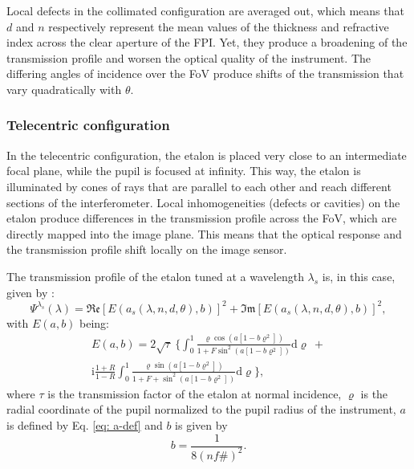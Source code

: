 Local defects in the collimated configuration are averaged out, which means that $d$ and $n$ respectively represent the mean values of the thickness and refractive index across the clear aperture of the FPI. Yet, they produce a broadening of the transmission profile and worsen the optical quality of the instrument. The differing angles of incidence over the FoV produce shifts of the transmission that vary quadratically with $\theta$.

\subsubsection{\label{susec: Tele-perfe}Telecentric configuration}

In the telecentric configuration, the etalon is placed very close to an intermediate focal plane, while the pupil is focused at infinity. This way, the etalon is illuminated by cones of rays that are parallel to each other and reach different sections of the interferometer. Local inhomogeneities (defects or cavities) on the etalon produce differences in the transmission profile across the FoV, which are directly mapped into the image plane. This means that the optical response and the transmission profile shift locally on the image sensor. 

The transmission profile of the etalon tuned at a wavelength $\lambda _s $ is, in this case, given by \citep{franIV}:
\begin{equation}
\Psi ^{\lambda _ s} (\lambda) =  \mathfrak{Re}\left[E(a_s (\lambda, n, d, \theta), b) \right] ^2 + \mathfrak{Im}\left[E(a_s(\lambda, n, d, \theta), b) \right] ^2 ,
\label{Eqn: Tel_first}
\end{equation}
with $E(a,b)$ being:
\begin{multline}
E(a, b) = 2 \sqrt{\tau}\ \Biggl\{ \int_0^1 \frac{\varrho \cos \left(a\left[1-b \varrho^2\right]\right)}{1+F \sin ^2\left(a\left[1-b \varrho^2\right]\right)} \mathrm{d} \varrho \ + \\
\mathrm{i} \frac{1+R}{1-R} \int_0^1 \frac{\varrho \sin \left(a\left[1-b \varrho^2\right]\right)}{1+F+ \sin ^2\left(a\left[1-b \varrho^2\right]\right)} \mathrm{d} \varrho\Biggr\} ,
\end{multline}
where $\tau$ is the transmission factor of the etalon at normal incidence, $\varrho$ is the radial coordinate of the pupil normalized to the pupil radius of the instrument, $a$ is defined by Eq. \eqref{eq: a-def} and $b$ is given by
\begin{equation}
b = \frac{1}{8 (nf\#) ^2}.
\end{equation}

